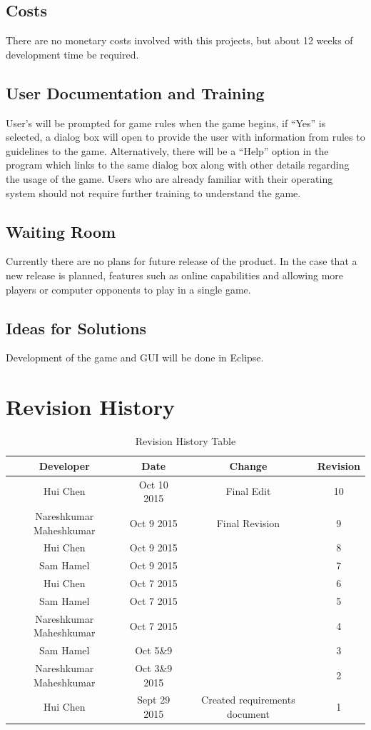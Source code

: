 \documentclass[12pt]{article}
\begin{document}
	\subsection{Costs}
	There are no monetary costs involved with this projects, but about 12 weeks of 				development time be required.
	\subsection{User Documentation and Training}
	User’s will be prompted for game rules when the game begins, if “Yes” is selected, a 		dialog box will open to provide the user with information from rules to guidelines to 		the game. Alternatively, there will be a “Help” option in the program which links to 		the same dialog box along with other details regarding the usage of the game. Users who 	are already familiar with their operating system should not require further training to 	understand the game. 
	\subsection{Waiting Room}
	Currently there are no plans for future release of the product. In the case that a new 		release is planned, features such as online capabilities and allowing more players or 		computer opponents to play in a single game. 
	\subsection{Ideas for Solutions}
	Development of the game and GUI will be done in Eclipse.
	\section{Revision History}
	\begin{table}[h]
	\begin{center}
	\caption{Revision History Table}
	\begin{tabular}{|| c c c c || }\\
	\hline
	Developer & Date & Change & Revision \\
	\hline
	Hui Chen & Oct 10 2015 & Final Edit & 10\\
	\hline
	Nareshkumar Maheshkumar & Oct 9 2015 & Final Revision & 9 \\
	\hline
	Hui Chen & Oct 9 2015 & & 8 \\
	\hline
	Sam Hamel & Oct 9 2015 & & 7 \\
	\hline
	Hui Chen & Oct 7 2015 & & 6 \\
	\hline
	Sam Hamel & Oct 7 2015 & & 5 \\
	\hline
	Nareshkumar Maheshkumar & Oct 7 2015 &	& 4	\\
	\hline
	Sam Hamel & Oct 5\&9 & & 3 \\
	\hline
	Nareshkumar Maheshkumar & Oct 3\&9 2015 & &2 \\
	\hline
	Hui Chen & Sept 29 2015& Created requirements document	& 1 \\

	\end{tabular}
	\end{center}
	\end{table}
	
\end{document}
